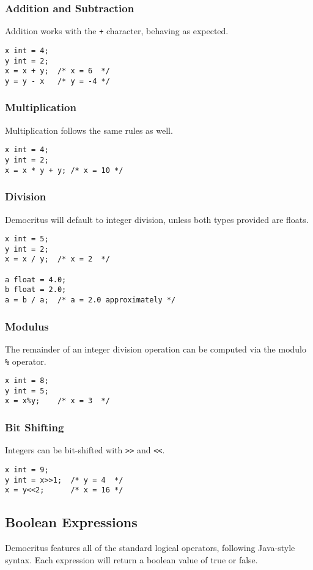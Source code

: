		\subsubsection{Addition and Subtraction}
			Addition works with the \texttt{+} character, behaving as expected.
			\begin{lstlisting}
x int = 4;
y int = 2;
x = x + y; 	/* x = 6  */
y = y - x 	/* y = -4 */
			\end{lstlisting}
						
		\subsubsection{Multiplication}
			Multiplication follows the same rules as well. 
			\begin{lstlisting}
x int = 4;
y int = 2;
x = x * y + y; /* x = 10 */
			\end{lstlisting}
			

		\subsubsection{Division}
			Democritus will default to integer division, unless both types provided are floats. 
			\begin{lstlisting}
x int = 5;
y int = 2;
x = x / y; 	/* x = 2  */

a float = 4.0;
b float = 2.0;
a = b / a; 	/* a = 2.0 approximately */
			\end{lstlisting}

        \subsubsection{Modulus}
            The remainder of an integer division operation can be computed via the modulo \texttt{\%} operator.
            \begin{lstlisting}
x int = 8;
y int = 5;
x = x%y; 	/* x = 3  */
			\end{lstlisting}
	
		\subsubsection{Bit Shifting}
			Integers can be bit-shifted with \verb|>>| and \verb|<<|.
			\begin{lstlisting}
x int = 9;
y int = x>>1;  /* y = 4  */
x = y<<2; 	   /* x = 16 */
			\end{lstlisting}
		
	\subsection{Boolean Expressions}
		Democritus features all of the standard logical operators, following Java-style syntax. Each expression will return a boolean value of true or false.

